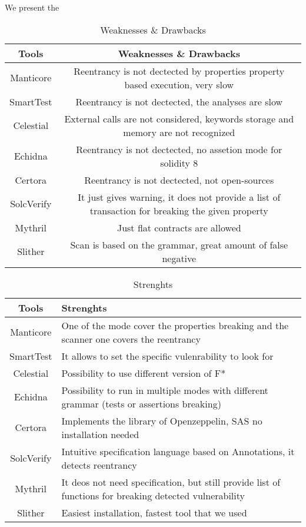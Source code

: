 We present the 
\begin{table*}
    \caption{Weaknesses \& Drawbacks}
    \label{tab:Weaknesses}
    \begin{tabular}{cc}
    \toprule
        Tools  &  Weaknesses \& Drawbacks \\
        \midrule
        Manticore & Reentrancy is not dectected by properties property 
        based execution, very slow \\
        SmartTest & Reentrancy is not dectected, the analyses are slow \\
        Celestial & External calls are not considered, keywords storage and 
        memory are not recognized  \\
        Echidna &  Reentrancy is not dectected, no assetion mode for solidity 8\\
        Certora & Reentrancy is not dectected, not open-sources \\ 
        SolcVerify & It just gives warning, it does not provide a list of 
        transaction for breaking the given property\\
        Mythril & Just flat contracts are allowed \\ 
        Slither & Scan is based on the grammar, great amount of false negative \\ 
    \bottomrule
    \end{tabular}
\end{table*}

\begin{table*}
    \caption{Strenghts}
        \label{tab:Strenghts}
        \begin{tabular}{cl}
        \toprule
            Tools  &  Strenghts \\
            \midrule
            Manticore & One of the mode cover the properties breaking and the scanner one covers the reentrancy\\
            SmartTest & It allows to set the specific vulenrability to look for  \\
            Celestial & Possibility to use different version of F*  \\
            Echidna &  Possibility to run in multiple modes with different grammar (tests or assertions breaking)\\
            Certora & Implements the library of Openzeppelin, SAS no installation needed \\ 
            SolcVerify & Intuitive specification language based on Annotations, it detects reentrancy\\
            Mythril & It deos not need specification, but still provide list of functions for breaking detected vulnerability  \\ 
            Slither & Easiest installation, fastest tool that we used \\ 
        \bottomrule
        \end{tabular}
    \end{table*}

